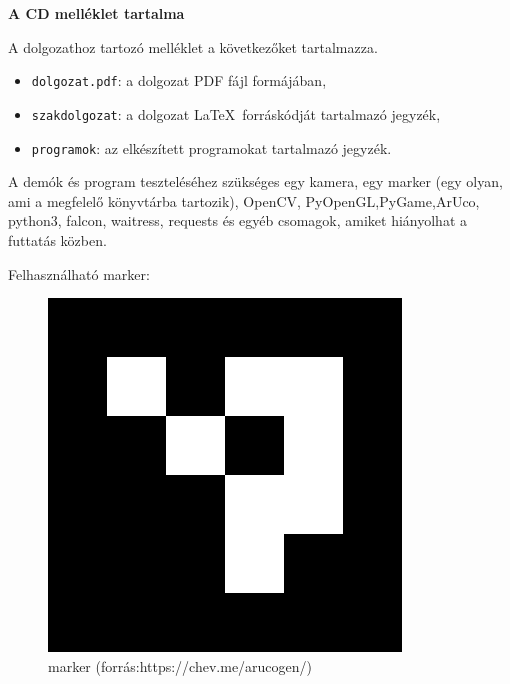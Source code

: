 \pagestyle{empty}

\noindent \textbf{\Large A CD melléklet tartalma}

\vskip 1cm

\noindent A dolgozathoz tartozó melléklet a következőket tartalmazza.

\begin{itemize}
\item \texttt{dolgozat.pdf}: a dolgozat PDF fájl formájában,
\item \texttt{szakdolgozat}: a dolgozat \LaTeX\ forráskódját tartalmazó jegyzék,
\item \texttt{programok}: az elkészített programokat tartalmazó jegyzék.
\end{itemize}


A demók és program teszteléséhez szükséges egy kamera, egy marker (egy olyan, ami a megfelelő könyvtárba tartozik),
OpenCV, PyOpenGL,PyGame,ArUco, python3, falcon, waitress, requests és egyéb csomagok, amiket hiányolhat a futtatás közben.

Felhasználható marker: 
\begin{figure}[htp]
    \centering
   	\includegraphics[scale=0.4]{images/marker.png}
	\caption{marker (forrás:https://chev.me/arucogen/)}
	\label{fig:marker}
\end{figure}


